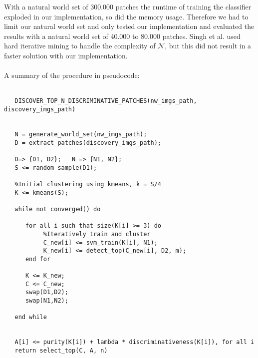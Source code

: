 With a natural world set of 300.000 patches the runtime of training the classifier exploded in our implementation, so did the
memory usage.
Therefore we had to limit our natural world set and only tested our implementation and evaluated the results with a 
natural world set of 40.000 to 80.000 patches. Singh et al. used hard iterative mining to handle the complexity of $\mathcal{N}$,
but this did not result in a faster solution with our implementation.\\
\\
A summary of the procedure in pseudocode:\\
\\
\begin{verbatim}
   DISCOVER_TOP_N_DISCRIMINATIVE_PATCHES(nw_imgs_path, discovery_imgs_path)


   N = generate_world_set(nw_imgs_path);
   D = extract_patches(discovery_imgs_path);
   
   D=> {D1, D2};   N => {N1, N2};
   S <= random_sample(D1); 
   
   %Initial clustering using kmeans, k = S/4
   K <= kmeans(S);
   
   while not converged() do
      
      for all i such that size(K[i] >= 3) do
           %Iteratively train and cluster
           C_new[i] <= svm_train(K[i], N1);
           K_new[i] <= detect_top(C_new[i], D2, m);
      end for
      
      K <= K_new;
      C <= C_new;
      swap(D1,D2);
      swap(N1,N2);
      
   end while
   
   
   A[i] <= purity(K[i]) + lambda * discriminativeness(K[i]), for all i
   return select_top(C, A, n)
\end{verbatim}
